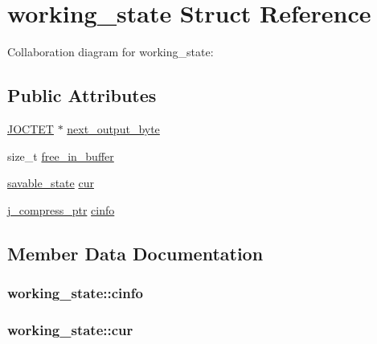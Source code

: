 \hypertarget{structworking__state}{}\section{working\+\_\+state Struct Reference}
\label{structworking__state}


Collaboration diagram for working\+\_\+state\+:
\subsection*{Public Attributes}
\begin{DoxyCompactItemize}
\item 
\hyperlink{jmorecfg_8h_a356ad249f20e691b520da439f92cccbc}{J\+O\+C\+T\+E\+T} $\ast$ \hyperlink{structworking__state_aa672d560261c7d8bb78f4014489f9661}{next\+\_\+output\+\_\+byte}
\item 
size\+\_\+t \hyperlink{structworking__state_a2a369c125a91f2aaebbb71ab52e37e7e}{free\+\_\+in\+\_\+buffer}
\item 
\hyperlink{structsavable__state}{savable\+\_\+state} \hyperlink{structworking__state_a9a55a26239810c0d5ec42c165ee74101}{cur}
\item 
\hyperlink{jpeglib_8h_add2a072c54e3a51550f4975f7ddb91e7}{j\+\_\+compress\+\_\+ptr} \hyperlink{structworking__state_ae54d796ba9c39bb85a922db336e3157b}{cinfo}
\end{DoxyCompactItemize}


\subsection{Member Data Documentation}
\hypertarget{structworking__state_ae54d796ba9c39bb85a922db336e3157b}{}
\subsubsection[{cinfo}]{ working\+\_\+state\+::cinfo}\label{structworking__state_ae54d796ba9c39bb85a922db336e3157b}
\hypertarget{structworking__state_a9a55a26239810c0d5ec42c165ee74101}{}
\subsubsection[{cur}]{ working\+\_\+state\+::cur}\label{structworking__state_a9a55a26239810c0d5ec42c165ee74101}
\hypertarget{structworking__state_a2a369c125a91f2aaebbb71ab52e37e7e}{}
